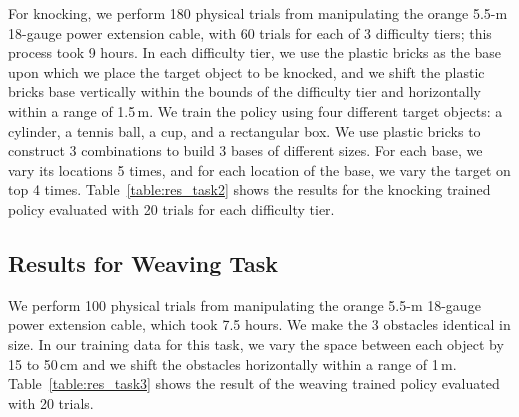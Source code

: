 For knocking, we perform 180 physical trials from manipulating the orange 5.5-m 18-gauge power extension cable, with 60 trials for each of 3 difficulty tiers; this process took 9 hours. In each difficulty tier, we use the plastic bricks as the base upon which we place the target object to be knocked, and we shift the plastic bricks base vertically within the bounds of the difficulty tier and horizontally within a range of 1.5\,m. We train the policy using four different target objects: a cylinder, a tennis ball, a cup, and a rectangular box. We use plastic bricks to construct 3 combinations to build 3 bases of different sizes. For each base, we vary its locations 5 times, and for each location of the base, we vary the target on top 4 times. 
Table~\ref{table:res_task2} shows the results for the knocking trained policy evaluated with 20 trials for each difficulty tier.%


\subsection{Results for Weaving Task}

We perform 100 physical trials from manipulating the orange 5.5-m 18-gauge power extension cable, which took 7.5 hours. We make the 3 obstacles identical in size. In our training data for this task, we vary the space between each object by 15 to 50\,cm and we shift the obstacles horizontally within a range of 1\,m.
Table~\ref{table:res_task3} shows the result of the weaving trained policy evaluated with 20 trials. %

